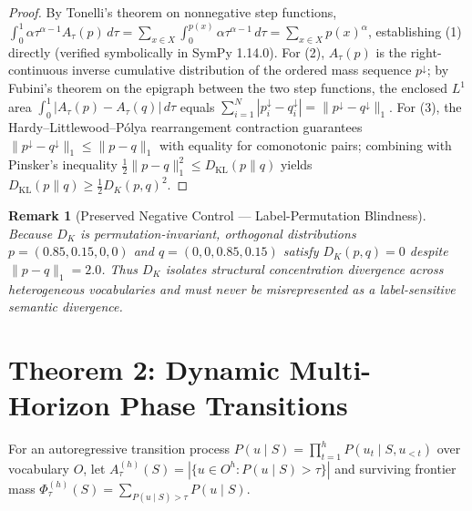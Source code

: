 \documentclass[11pt,letterpaper]{article}
\newtheorem{remark}{Remark}
\begin{document}
\begin{proof}
By Tonelli's theorem on nonnegative step functions,
$\int_0^1 \alpha \tau^{\alpha-1} A_\tau(p)\,d\tau = \sum_{x \in X} \int_0^{p(x)} \alpha \tau^{\alpha-1}\,d\tau = \sum_{x \in X} p(x)^\alpha$,
establishing (1) directly (verified symbolically in SymPy 1.14.0). For (2), $A_\tau(p)$ is the right-continuous inverse cumulative distribution of the ordered mass sequence $p^\downarrow$; by Fubini's theorem on the epigraph between the two step functions, the enclosed $L^1$ area $\int_0^1 |A_\tau(p) - A_\tau(q)|\,d\tau$ equals $\sum_{i=1}^N |p^\downarrow_i - q^\downarrow_i| = \|p^\downarrow - q^\downarrow\|_1$. For (3), the Hardy--Littlewood--P\'olya rearrangement contraction guarantees $\|p^\downarrow - q^\downarrow\|_1 \le \|p - q\|_1$ with equality for comonotonic pairs; combining with Pinsker's inequality $\frac{1}{2}\|p - q\|_1^2 \le D_{\mathrm{KL}}(p \parallel q)$ yields $D_{\mathrm{KL}}(p \parallel q) \ge \frac{1}{2} D_K(p, q)^2$.
\end{proof}

\begin{remark}[Preserved Negative Control --- Label-Permutation Blindness]
Because $D_K$ is permutation-invariant, orthogonal distributions $p = (0.85, 0.15, 0, 0)$ and $q = (0, 0, 0.85, 0.15)$ satisfy $D_K(p, q) = 0$ despite $\|p - q\|_1 = 2.0$. Thus $D_K$ isolates \emph{structural concentration divergence} across heterogeneous vocabularies and must never be misrepresented as a label-sensitive semantic divergence.
\end{remark}

\section{Theorem 2: Dynamic Multi-Horizon Phase Transitions}
For an autoregressive transition process $P(u \mid S) = \prod_{t=1}^h P(u_t \mid S, u_{<t})$ over vocabulary $O$, let $A_\tau^{(h)}(S) = |\{u \in O^h : P(u \mid S) > \tau\}|$ and surviving frontier mass $\Phi_\tau^{(h)}(S) = \sum_{P(u\mid S) > \tau} P(u \mid S)$.
\end{document}
